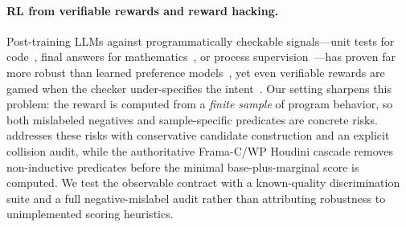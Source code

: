 \paragraph{RL from verifiable rewards and reward hacking.}
Post-training LLMs against programmatically checkable signals---unit tests for code~\citep{le2022coderl,gehring2024rlef,chen2021evaluating}, final answers for mathematics~\citep{shao2024deepseekmath,lambert2024tulu,deepseekr1}, or process supervision~\citep{lightman2023lets}---has proven far more robust than learned preference models~\citep{ouyang2022training,rafailov2023direct}, yet even verifiable rewards are gamed when the checker under-specifies the intent~\citep{amodei2016concrete,skalse2022defining,gao2023scaling}.
Our setting sharpens this problem: the reward is computed from a \emph{finite sample} of program behavior, so both mislabeled negatives and sample-specific predicates are concrete risks.
\sam{} addresses these risks with conservative candidate construction and an explicit collision audit, while the authoritative Frama-C/WP Houdini cascade removes non-inductive predicates before the minimal base-plus-marginal score is computed.  We test the observable contract with a known-quality discrimination suite and a full negative-mislabel audit rather than attributing robustness to unimplemented scoring heuristics.
